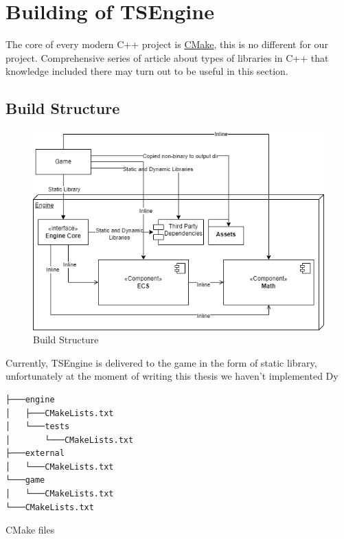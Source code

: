 \newpage

\section{Building of TSEngine}
\label{sec:build}
The core of every modern C++ project is \hyperref[sec:stack_cmake]{CMake}, this is no different for our project.
Comprehensive series of article about types of libraries in C++ \cite{cpplibs} that knowledge included there may turn out to be useful in this section.
\subsection{Build Structure}
\label{sec:build_struct}
\begin{figure}
  \includegraphics[width=\linewidth]{figures/build.png}
  \caption{Build Structure}
\end{figure}
Currently, TSEngine is delivered to the game in the form of static library, unfortunately at the moment of writing this thesis we haven't implemented Dy 
\begin{verbatim}
├───engine
│   ├───CMakeLists.txt
│   └───tests
│       └───CMakeLists.txt
├───external
│   └───CMakeLists.txt
└───game
│   └───CMakeLists.txt
└───CMakeLists.txt
\end{verbatim}
\begin{table}[h]
\caption{CMake files}
\end{table}
\newpage
